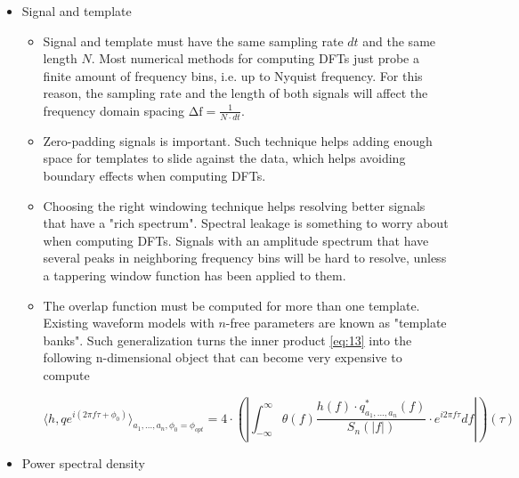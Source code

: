 \begin{itemize}

\item Signal and template
	\begin{itemize}
	
	\item Signal and template must have the same sampling rate $dt$ and the same length $N$. Most numerical methods for computing DFTs just probe a finite amount of frequency bins, i.e. up to Nyquist frequency. For this reason, the sampling rate and the length of both signals will affect the frequency domain spacing $\mathrm{\Delta f}=\frac{1}{N\cdot dt}$.
	
	\item Zero-padding signals is important. Such technique helps adding enough space for templates to slide against the data, which helps avoiding boundary effects when computing DFTs.
	\item Choosing the right windowing technique helps resolving better signals that have a "rich spectrum". Spectral leakage is something to worry about when computing DFTs. Signals with an amplitude spectrum that have several peaks in neighboring frequency bins will be hard to resolve, unless a tappering window function has been applied to them.
	
	\item The overlap function must be computed for more than one template. Existing waveform models with $n$-free parameters  are known as "template banks". Such generalization turns the inner product \ref{eq:13} into the following n-dimensional object that can become very expensive to compute
	
\begin{equation}\label{inn}
\langle h,q e^{i(2\pi f \tau + \phi_0)} \rangle_{a_1, ..., a_n,\phi_0=\phi_{opt}} =4\cdot \left( \left| \int_{-\infty}^{\infty} \theta(f)\frac{h(f) \cdot q^{*}_{a_1, ..., a_n}(f) }{S_n(|f|)} \cdot e^{i 2\pi f \tau} df \right| \right)(\tau)
\end{equation}

	\end{itemize}
	
\item Power spectral density
	\begin{itemize}
	

\end{itemize}
\end{itemize}
